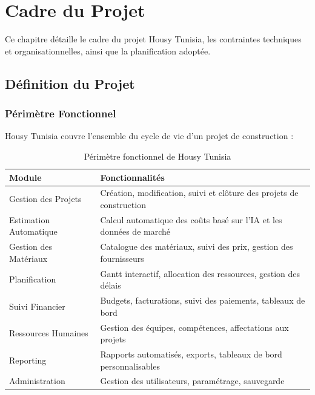\documentclass[12pt, a4paper]{report}
\begin{document}
\chapter{Cadre du Projet}

\begin{objectivebox}
Ce chapitre détaille le cadre du projet Housy Tunisia, les contraintes techniques et organisationnelles, ainsi que la planification adoptée.
\end{objectivebox}

\section{Définition du Projet}

\subsection{Périmètre Fonctionnel}

Housy Tunisia couvre l'ensemble du cycle de vie d'un projet de construction :

\begin{table}[h]
\centering
\caption{Périmètre fonctionnel de Housy Tunisia}
\begin{tabular}{|l|p{8cm}|}
\hline
\textbf{Module} & \textbf{Fonctionnalités} \\
\hline
Gestion des Projets & Création, modification, suivi et clôture des projets de construction \\
\hline
Estimation Automatique & Calcul automatique des coûts basé sur l'IA et les données de marché \\
\hline
Gestion des Matériaux & Catalogue des matériaux, suivi des prix, gestion des fournisseurs \\
\hline
Planification & Gantt interactif, allocation des ressources, gestion des délais \\
\hline
Suivi Financier & Budgets, facturations, suivi des paiements, tableaux de bord \\
\hline
Ressources Humaines & Gestion des équipes, compétences, affectations aux projets \\
\hline
Reporting & Rapports automatisés, exports, tableaux de bord personnalisables \\
\hline
Administration & Gestion des utilisateurs, paramétrage, sauvegarde \\
\hline
\end{tabular}
\end{table}
\end{document}
